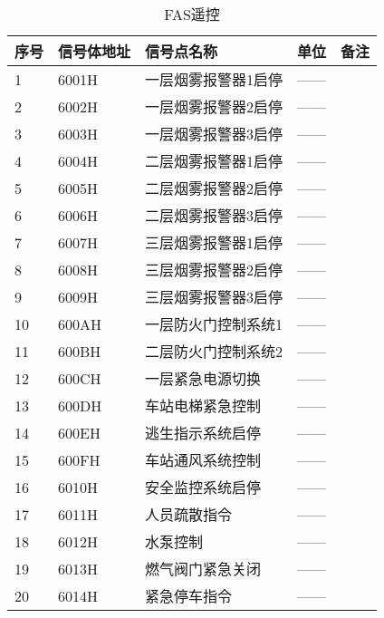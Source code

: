 \begin{longtable}[c]{|l|l|l|l|l|}
	\caption{FAS遥控}
	\label{tab:my-table}\\
	\hline
	\textbf{序号} & \textbf{信号体地址} & \textbf{信号点名称} & \textbf{单位} & \textbf{备注} \\ \hline
	\endfirsthead
	\endhead
	1           & 6001H          & 一层烟雾报警器1启停     & ——          &             \\ \hline
	2           & 6002H          & 一层烟雾报警器2启停     & ——          &             \\ \hline
	3           & 6003H          & 一层烟雾报警器3启停     & ——          &             \\ \hline
	4           & 6004H          & 二层烟雾报警器1启停     & ——          &             \\ \hline
	5           & 6005H          & 二层烟雾报警器2启停     & ——          &             \\ \hline
	6           & 6006H          & 二层烟雾报警器3启停     & ——          &             \\ \hline
	7           & 6007H          & 三层烟雾报警器1启停     & ——          &             \\ \hline
	8           & 6008H          & 三层烟雾报警器2启停     & ——          &             \\ \hline
	9           & 6009H          & 三层烟雾报警器3启停     & ——          &             \\ \hline
	10          & 600AH          & 一层防火门控制系统1     & ——          &             \\ \hline
	11          & 600BH          & 二层防火门控制系统2     & ——          &             \\ \hline
	12          & 600CH          & 一层紧急电源切换       & ——          &             \\ \hline
	13          & 600DH          & 车站电梯紧急控制       & ——          &             \\ \hline
	14          & 600EH          & 逃生指示系统启停       & ——          &             \\ \hline
	15          & 600FH          & 车站通风系统控制       & ——          &             \\ \hline
	16          & 6010H          & 安全监控系统启停       & ——          &             \\ \hline
	17          & 6011H          & 人员疏散指令         & ——          &             \\ \hline
	18          & 6012H          & 水泵控制           & ——          &             \\ \hline
	19          & 6013H          & 燃气阀门紧急关闭       & ——          &             \\ \hline
	20          & 6014H          & 紧急停车指令         & ——          &             \\ \hline
\end{longtable}

